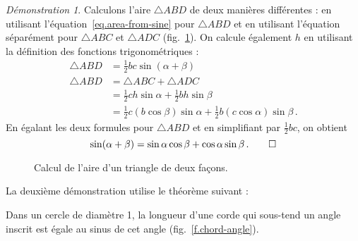 \noindent \emph{Démonstration 1}. 
Calculons l'aire  $\triangle ABD$ de deux manières différentes :  en utilisant l'équation~\ref{eq.area-from-sine} pour $\triangle ABD$ et  en utilisant l'équation séparément pour $\triangle ABC$ et $\triangle ADC$ (fig.~\ref{f.sin-sum2}).
On calcule également  $h$ en utilisant la définition des fonctions trigonométriques :
\begin{align*}
\triangle ABD &= \frac{1}{2}bc\sin(\alpha+\beta)\\
\triangle ABD &= \triangle ABC+\triangle ADC\\
&= \frac{1}{2}ch\sin \alpha + \frac{1}{2}bh\sin \beta\\
&= \frac{1}{2}c(b\cos\beta)\sin \alpha + \frac{1}{2}b(c\cos\alpha)\sin \beta\,.
\end{align*}
En égalant les deux formules pour $\triangle ABD$ et en simplifiant par $\frac{1}{2}bc$, on obtient 
\[
\sin(\alpha+\beta)=\sin\alpha\cos\beta+\cos \alpha\sin\beta\,.  \qed
\]



\begin{figure}[htbp]
\centering

\caption{Calcul de l'aire d'un triangle de deux façons.}\label{f.sin-sum2}
\end{figure}

\enlargethispage{\baselineskip}

La deuxième démonstration utilise le théorème suivant :
\begin{theorem}
Dans un cercle de diamètre 1, la longueur d'une corde qui sous-tend un angle inscrit est égale au sinus de cet angle (fig.~\ref{f.chord-angle}).
\end{theorem}

